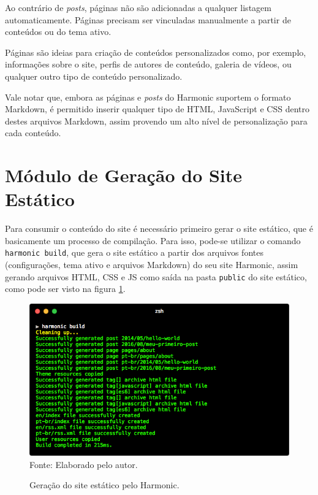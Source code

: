 \documentclass[ppginf, pep]{esinucpel}
\newcommand{\code}[1]{\texttt{#1}}
\begin{document}
Ao contrário de \textit{posts}, páginas não são adicionadas a qualquer listagem automaticamente. Páginas precisam ser vinculadas manualmente a partir de conteúdos ou do tema ativo.

Páginas são ideias para criação de conteúdos personalizados como, por exemplo, informações sobre o site, perfis de autores de conteúdo, galeria de vídeos, ou qualquer outro tipo de conteúdo personalizado.

Vale notar que, embora as páginas e \textit{posts} do Harmonic suportem o formato Markdown, é permitido inserir qualquer tipo de HTML, JavaScript e CSS dentro destes arquivos Markdown, assim provendo um alto nível de personalização para cada conteúdo.

\section{Módulo de Geração do Site Estático}

Para consumir o conteúdo do site é necessário primeiro gerar o site estático, que é basicamente um processo de compilação. Para isso, pode-se utilizar o comando \code{harmonic build}, que gera o site estático a partir dos arquivos fontes (configurações, tema ativo e arquivos Markdown) do seu site Harmonic, assim gerando arquivos HTML, CSS e JS como saída na pasta \code{public} do site estático, como pode ser visto na figura \ref{fig:comando_harmonic_build}.

\begin{figure}[htbp]
    \centering
    \caption{Geração do site estático pelo Harmonic.}
    \vspace{5pt}
    \includegraphics[width=\textwidth]{harmonic_build}
    \\Fonte: Elaborado pelo autor.
    \label{fig:comando_harmonic_build}
\end{figure}
\end{document}
